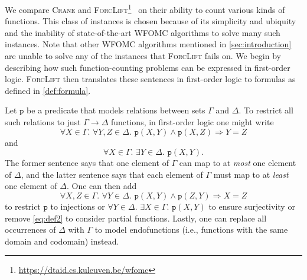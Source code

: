 \documentclass{article}
\theoremstyle{definition}
\theoremstyle{remark}
\begin{document}

We compare \textsc{Crane} and
\textsc{ForcLift}\footnote{\url{https://dtaid.cs.kuleuven.be/wfomc}}~\cite{DBLP:conf/ijcai/BroeckTMDR11}
on their ability to count various kinds of functions. This class of instances is
chosen because of its simplicity and ubiquity and the inability of
state-of-the-art WFOMC algorithms to solve many such instances. Note that other
WFOMC algorithms mentioned in \cref{sec:introduction} are unable to solve any of
the instances that \textsc{ForcLift} fails on. We begin by describing how such
function-counting problems can be expressed in first-order logic.
\textsc{ForcLift} then translates these sentences in first-order logic to
formulas as defined in \cref{def:formula}.

Let $\texttt{p}$ be a predicate that models relations between sets $\Gamma$ and
$\Delta$. To restrict all such relations to just $\Gamma \to \Delta$ functions,
in first-order logic one might write
\[
  \forall X \in \Gamma\text{. }\forall Y,Z \in \Delta\text{. }\texttt{p}(X, Y) \land \texttt{p}(X, Z) \Rightarrow Y = Z
\]
and
\begin{equation}\label{eq:def2}
  \forall X \in \Gamma\text{. }\exists Y \in \Delta\text{. }\texttt{p}(X, Y).
\end{equation}
The former sentence says that one element of $\Gamma$ can map to at \emph{most}
one element of $\Delta$, and the latter sentence says that each element of
$\Gamma$ must map to at \emph{least} one element of $\Delta$. One can then add
\[
  \forall X,Z \in \Gamma\text{. }\forall Y \in \Delta\text{. }\texttt{p}(X, Y) \land \texttt{p}(Z, Y) \Rightarrow X = Z
\]
to restrict $\texttt{p}$ to injections or
  $\forall Y \in \Delta\text{. }\exists X \in \Gamma\text{. }\texttt{p}(X, Y)$
to ensure surjectivity or remove \cref{eq:def2} to consider partial functions.
Lastly, one can replace all occurrences of $\Delta$ with $\Gamma$ to model
endofunctions (i.e., functions with the same domain and codomain) instead.
\end{document}
